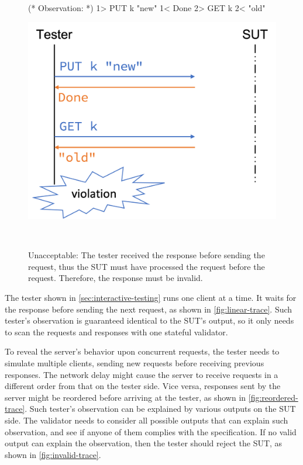\begin{figure}
  \centering
  \begin{minipage}[c]{.3\textwidth}
\begin{coq}
  (* Observation: *)
  1> PUT k "new"
  1< Done
  2> GET k
  2< "old"
\end{coq}
  \end{minipage}\begin{minipage}[c]{.4\textwidth}
  \includegraphics[width=\linewidth]{figures/invalid-trace}
  \end{minipage}\begin{minipage}[c]{.3\textwidth}\
  \end{minipage}
  \caption[Invalid trace that violates the specification.]{Unacceptable: The
    tester received the \ilc{Done} response before sending the 
    request, thus the SUT must have processed the \ilc{PUT} request before the
    \ilc{GET} request.  Therefore, the \ilc{"old"} response must be invalid.}
  \label{fig:invalid-trace}
\end{figure}
The tester shown in \autoref{sec:interactive-testing} runs one client at a time.
It waits for the response before sending the next request, as shown in
\autoref{fig:linear-trace}.  Such tester's observation is guaranteed identical
to the SUT's output, so it only needs to scan the requests and responses with
one stateful validator.

To reveal the server's behavior upon concurrent requests, the tester needs to
simulate multiple clients, sending new requests before receiving previous
responses.  The network delay might cause the server to receive requests in a
different order from that on the tester side.  Vice versa, responses sent by the
server might be reordered before arriving at the tester, as shown in
\autoref{fig:reordered-trace}.  Such tester's observation can be explained by
various outputs on the SUT side.  The validator needs to consider all possible
outputs that can explain such observation, and see if anyone of them complies
with the specification.  If no valid output can explain the observation, then
the tester should reject the SUT, as shown in \autoref{fig:invalid-trace}.

